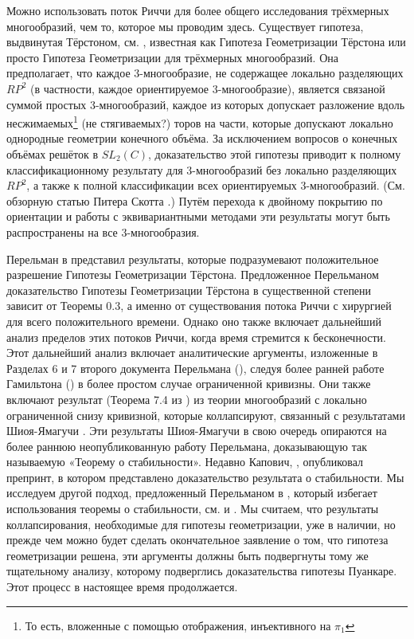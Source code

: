 Можно использовать поток Риччи для более общего исследования трёхмерных многообразий, 
чем то, которое мы проводим здесь. Существует гипотеза, выдвинутая Тёрстоном, см. \cite{c69}, 
известная как Гипотеза Геометризации Тёрстона или просто Гипотеза Геометризации для 
трёхмерных многообразий. Она предполагает, что каждое 3-многообразие, не содержащее 
локально разделяющих $RP^{2}$ (в частности, каждое ориентируемое 3-многообразие), является 
связаной суммой простых 3-многообразий, каждое из которых допускает разложение 
вдоль несжимаемых\footnote{То есть, вложенные с помощью отображения, инъективного на $\pi_{1}$} 
(не стягиваемых?) торов на части, которые допускают локально однородные геометрии 
конечного объёма. За исключением вопросов о конечных объёмах решёток в $SL_{2}(C)$, 
доказательство этой гипотезы приводит к полному классификационному результату для 
3-многообразий без локально разделяющих $RP^{2}$, а также к полной классификации всех 
ориентируемых 3-многообразий. (См. обзорную статью Питера Скотта \cite{c63}.) 
Путём перехода к двойному покрытию по ориентации и работы с эквивариантными 
методами эти результаты могут быть распространены на все 3-многообразия.

Перельман в \cite{c55} представил результаты, которые подразумевают положительное разрешение 
Гипотезы Геометризации Тёрстона. Предложенное Перельманом доказательство Гипотезы 
Геометризации Тёрстона в существенной степени зависит от Теоремы 0.3, а именно от 
существования потока Риччи с хирургией для всего положительного времени. Однако оно 
также включает дальнейший анализ пределов этих потоков Риччи, когда время стремится 
к бесконечности. Этот дальнейший анализ включает аналитические аргументы, изложенные 
в Разделах 6 и 7 второго документа Перельмана (\cite{c55}), следуя более ранней работе 
Гамильтона (\cite{c36}) в более простом случае ограниченной кривизны. Они также включают 
результат (Теорема 7.4 из \cite{c55}) из теории многообразий с локально ограниченной снизу 
кривизной, которые коллапсируют, связанный с результатами Шиоя-Ямагучи \cite{c67}. Эти 
результаты Шиоя-Ямагучи в свою очередь опираются на более раннюю неопубликованную 
работу Перельмана, доказывающую так называемую «Теорему о стабильности». Недавно 
Капович, \cite{c43}, опубликовал препринт, в котором представлено доказательство результата 
о стабильности. Мы исследуем другой подход, предложенный Перельманом в \cite{c55}, который 
избегает использования теоремы о стабильности, см. \cite{c44} и \cite{c51}. Мы считаем, что 
результаты коллапсирования, необходимые для гипотезы геометризации, уже в наличии, 
но прежде чем можно будет сделать окончательное заявление о том, что гипотеза 
геометризации решена, эти аргументы должны быть подвергнуты тому же тщательному 
анализу, которому подверглись доказательства гипотезы Пуанкаре. Этот процесс в 
настоящее время продолжается.


